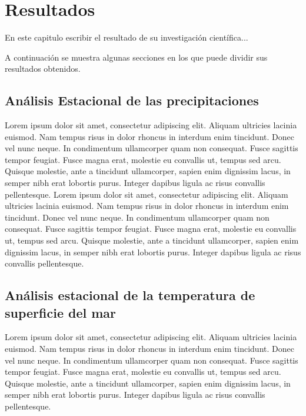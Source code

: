 \chapter{Resultados}
\label{cap3}

En este capitulo escribir el resultado de su investigación científica...

A continuación se muestra algunas secciones en los que puede dividir sus resultados obtenidos.

\section{Análisis Estacional de las precipitaciones}

Lorem ipsum dolor sit amet, consectetur adipiscing elit. Aliquam ultricies lacinia euismod. Nam tempus risus in dolor rhoncus in interdum enim tincidunt. Donec vel nunc neque. In condimentum ullamcorper quam non consequat. Fusce sagittis tempor feugiat. Fusce magna erat, molestie eu convallis ut, tempus sed arcu. Quisque molestie, ante a tincidunt ullamcorper, sapien enim dignissim lacus, in semper nibh erat lobortis purus. Integer dapibus ligula ac risus convallis pellentesque. Lorem ipsum dolor sit amet, consectetur adipiscing elit. Aliquam ultricies lacinia euismod. Nam tempus risus in dolor rhoncus in interdum enim tincidunt. Donec vel nunc neque. In condimentum ullamcorper quam non consequat. Fusce sagittis tempor feugiat. Fusce magna erat, molestie eu convallis ut, tempus sed arcu. Quisque molestie, ante a tincidunt ullamcorper, sapien enim dignissim lacus, in semper nibh erat lobortis purus. Integer dapibus ligula ac risus convallis pellentesque.

\section{Análisis estacional de la temperatura de superficie del mar}

Lorem ipsum dolor sit amet, consectetur adipiscing elit. Aliquam ultricies lacinia euismod. Nam tempus risus in dolor rhoncus in interdum enim tincidunt. Donec vel nunc neque. In condimentum ullamcorper quam non consequat. Fusce sagittis tempor feugiat. Fusce magna erat, molestie eu convallis ut, tempus sed arcu. Quisque molestie, ante a tincidunt ullamcorper, sapien enim dignissim lacus, in semper nibh erat lobortis purus. Integer dapibus ligula ac risus convallis pellentesque.

